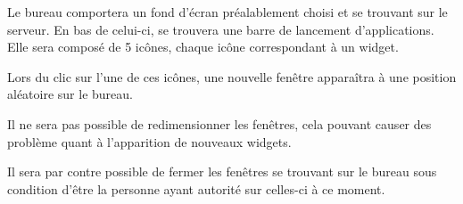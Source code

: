 Le bureau comportera un fond d'écran préalablement choisi et se trouvant sur le serveur. En bas de celui-ci, se trouvera une barre de lancement d'applications. Elle sera composé de 5 icônes, chaque icône correspondant à un widget. 

Lors du clic sur l'une de ces icônes, une nouvelle fenêtre apparaîtra à une position aléatoire sur le bureau.

Il ne sera pas possible de redimensionner les fenêtres, cela pouvant causer des problème quant à l'apparition de nouveaux widgets. 

Il sera par contre possible de fermer les fenêtres se trouvant sur le bureau sous condition d'être la personne ayant autorité sur celles-ci à ce moment.
